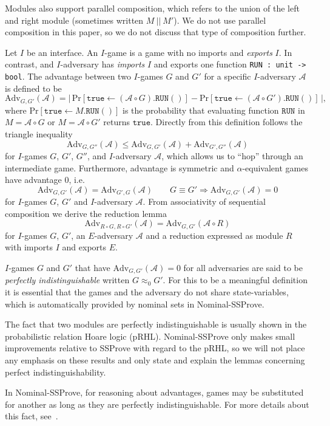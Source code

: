 \documentclass[a4paper,USenglish,cleveref, autoref]{lipics-v2021}
\newcommand{\Adv}{\mathrm{Adv}}
\newcommand{\A}{\mathcal{A}}
\newcommand{\NSSP}{Nominal-SSProve\xspace}
\begin{document}
Modules also support parallel composition, which refers to the union of the left and right module (sometimes written $M\ ||\ M'$). We do not use parallel composition in this paper, so we do not discuss that type of composition further.

Let $I$ be an interface. An $I$-game is a game with no imports and \emph{exports} $I$. In contrast, and $I$-adversary has \emph{imports} $I$ and exports one function \texttt{RUN : unit -> bool}.
The advantage between two $I$-games $G$ and $G'$ for a specific $I$-adversary
$\A$ is defined to be
$$\Adv_{G,G'}(\A) =
  |\,\mathrm{Pr}[\texttt{true} \leftarrow (\A \circ G).\texttt{RUN}() ]
  - \mathrm{Pr}[\texttt{true} \leftarrow (\A \circ G').\texttt{RUN}()]\,|,$$
where $\mathrm{Pr}[\texttt{true} \leftarrow M.\texttt{RUN}()]$ is the
probability that evaluating function $\texttt{RUN}$ in $M=\A \circ G$ or $M=\A \circ G'$ returns $\texttt{true}$.  Directly from this definition follows the triangle inequality
$$\Adv_{G,G''}(\A) \leq \Adv_{G, G'}(\A) + \Adv_{G', G''}(\A)$$
for $I$-games $G$, $G'$, $G''$, and $I$-adversary $\A$,
which allows us to ``hop'' through an intermediate game.
Furthermore, advantage is symmetric and $\alpha$-equivalent games
 have advantage $0$, i.e.\ 
$$\Adv_{G, G'}(\A) = \Adv_{G', G}(\A)\qquad G \equiv G' \Rightarrow \Adv_{G, G'}(\A) = 0$$
for $I$-games $G$, $G'$ and $I$-adversary $\A$.
From associativity of sequential composition we derive the reduction lemma
$$\Adv_{R \circ G, R \circ G'}(\A) = \Adv_{G, G'}(\A \circ R)$$
for $I$-games $G$, $G'$, an $E$-adversary $\A$ and a reduction expressed as module $R$ with imports $I$ and exports $E$.

$I$-games $G$ and $G'$ that have $\Adv_{G, G'}(\A) = 0$ for all adversaries are said to be \emph{perfectly indistinguishable} written $G \approx_0 G'$.
For this to be a meaningful definition it is essential that the games and
the adversary do not share state-variables, which is automatically provided by nominal sets in \NSSP.

The fact that two modules are perfectly indistinguishable is usually shown
in the probabilistic relation Hoare logic (pRHL). 
Nominal-SSProve only makes small improvements relative to SSProve with regard to the pRHL, so we will not place any emphasis on these results and only state and explain the lemmas concerning perfect indistinguishability.

In \NSSP, for reasoning about advantages, games may be substituted for another as long as they are perfectly indistinguishable. For more details about this fact, see~\cite{nssp-preprint}.
\end{document}
